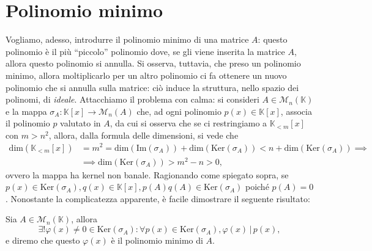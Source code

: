 \section{Polinomio minimo}

Vogliamo, adesso, introdurre il polinomio minimo di una matrice $A$: questo polinomio è il più ``piccolo'' polinomio dove, se gli viene inserita la matrice $A$, allora questo polinomio si annulla. Si osserva, tuttavia, che preso un polinomio minimo, allora moltiplicarlo per un altro polinomio ci fa ottenere un nuovo polinomio che si annulla sulla matrice: ciò induce la struttura,
nello spazio dei polinomi, di \emph{ideale}. Attacchiamo il problema con calma: si consideri $A \in \mathcal{M}_n(\mathbb{K})$ e la mappa $\sigma_A: \mathbb{K}[x] \to \mathcal{M}_n(A)$ che, ad ogni polinomio $p(x) \in \mathbb{K}[x]$, associa il polinomio $p$ valutato in $A$, da cui si osserva che se ci restringiamo a $\mathbb{K}_{< m}[x]$ con $m > n^2$, allora, dalla formula delle dimensioni, si vede che
\begin{align}
    \text{dim}(\mathbb{K}_{< m}[x]) &= m^2 = \text{dim}(\text{Im}(\sigma_A)) + \text{dim}(\text{Ker}(\sigma_A)) < n + \text{dim}(\text{Ker}(\sigma_A)) \implies \\
    &\implies \text{dim}(\text{Ker}(\sigma_A)) > m^2 - n > 0,
\end{align}  
ovvero la mappa ha kernel non banale. Ragionando come spiegato sopra, se $p(x) \in \text{Ker}(\sigma_A), q(x) \in \mathbb{K}[x], p(A)q(A) \in \text{Ker}(\sigma_A)$ poiché $p(A) = 0$. Nonostante la complicatezza apparente, è facile dimostrare il seguente risultato:
\begin{theorem}
    Sia $A \in \mathcal{M}_n(\mathbb{K})$, allora
    $$
        \exists! \varphi(x) \neq 0 \in \text{Ker}(\sigma_A) : \forall p(x) \in \text{Ker}(\sigma_A), \varphi(x) \, | \, p(x),  
    $$
    e diremo che questo $\varphi(x)$ è il polinomio minimo di $A$.
\end{theorem}
